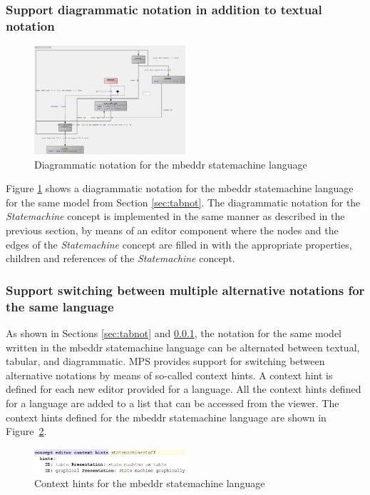 \documentclass[preprint,numbers,10pt]{sigplanconf}
\begin{document}
\subsubsection{Support diagrammatic notation in addition to textual notation}\label{sec:dianot}
\begin{figure}[H]
	\centering
	\includegraphics[width=0.50\textwidth]{screens/DiagrammaticNotationStatemachines.png}
	\caption{Diagrammatic notation for the mbeddr statemachine
	language}
	\label{fig:dianotationsm}
\end{figure}

Figure \ref{fig:dianotationsm} shows a diagrammatic notation for the mbeddr statemachine language for the same model from Section \ref{sec:tabnot}.
The diagrammatic notation for the \emph{Statemachine} concept is implemented in the same manner as described in the previous section,
by means of an editor component where the nodes and the edges of the \emph{Statemachine} concept
are filled in with the appropriate properties, children and references of the \emph{Statemachine} concept.

\subsubsection{Support switching between multiple alternative notations for the same language}
As shown in Sections \ref{sec:tabnot} and \ref{sec:dianot}, the notation for the same model written
in the mbeddr statemachine language can be alternated between textual, tabular, and diagrammatic.
MPS provides support for switching between alternative notations by means of so-called context hints.
A context hint is defined for each new editor provided for a language.
All the context hints defined for a language are added to a list that can be accessed from the viewer.
The context hints defined for the mbeddr statemachine language are shown in Figure~\ref{fig:contextHints}.

\begin{figure}[H]
	\centering
	\includegraphics[width=0.50\textwidth]{screens/ContextHints.png}
	\caption{Context hints for the mbeddr statemachine language}
	\label{fig:contextHints}
\end{figure}
\end{document}
